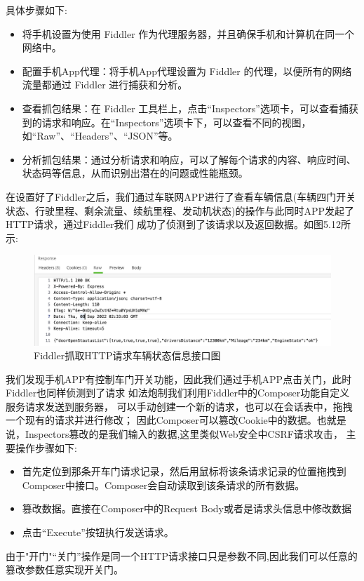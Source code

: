 具体步骤如下:
\begin{itemize}
    \item 将手机设置为使用 Fiddler 作为代理服务器，并且确保手机和计算机在同一个网络中。
    \item 配置手机App代理：将手机App代理设置为 Fiddler 的代理，以便所有的网络流量都通过 Fiddler 进行捕获和分析。
    \item 查看抓包结果：在 Fiddler 工具栏上，点击“Inspectors”选项卡，可以查看捕获到的请求和响应。在“Inspectors”选项卡下，可以查看不同的视图，如“Raw”、“Headers”、“JSON”等。
    \item 分析抓包结果：通过分析请求和响应，可以了解每个请求的内容、响应时间、状态码等信息，从而识别出潜在的问题或性能瓶颈。
\end{itemize}

在设置好了Fiddler之后，我们通过车联网APP进行了查看车辆信息(车辆四门开关状态、行驶里程、剩余流量、续航里程、发动机状态)的操作与此同时APP发起了HTTP请求，通过Fiddler我们
成功了侦测到了该请求以及返回数据。如图5.12所示:
\begin{figure}
  \centering
  \includegraphics[scale=0.5]{resources/img/i26.png}
  \caption{Fiddler抓取HTTP请求车辆状态信息接口图}
\end{figure}
我们发现手机APP有控制车门开关功能，因此我们通过手机APP点击关门，此时Fiddler也同样侦测到了请求
如法炮制我们利用Fiddler中的Composer功能自定义服务请求发送到服务器，
可以手动创建一个新的请求，也可以在会话表中，拖拽一个现有的请求并进行修改；
因此Composer可以篡改Cookie中的数据。也就是说，Inspectors篡改的是我们输入的数据,这里类似Web安全中CSRF请求攻击\cite{blatz2007csrf}，
主要操作步骤如下:
\begin{itemize}
  \item 首先定位到那条开车门请求记录，然后用鼠标将该条请求记录的位置拖拽到Composer中接口。Composer会自动读取到该条请求的所有数据。
  \item 篡改数据。直接在Composer中的Request Body或者是请求头信息中修改数据
  \item 点击“Execute”按钮执行发送请求。
\end{itemize}
由于"开门"“关门”操作是同一个HTTP请求接口只是参数不同,因此我们可以任意的篡改参数任意实现开关门。

